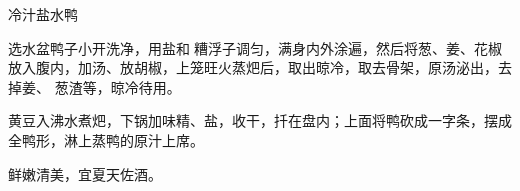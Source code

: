 \begin{recipe}{冷汁盐水鸭}

\ingredients


\preparation

\step 选水盆鸭子小开洗净，用盐和𰪿糟浮子调匀，满身内外涂遍，然后将葱、姜、花椒
放入腹内，加汤、放胡椒，上笼旺火蒸𤆵后，取出晾冷，取去骨架，原汤泌出，去掉姜、
葱渣等，晾冷待用。

\step 黄豆入沸水煮𤆵，下锅加味精、盐，收干，扦在盘内；上面将鸭砍成一字条，摆成
全鸭形，淋上蒸鸭的原汁上席。

\features

鲜嫩清美，宜夏天佐酒。

\end{recipe}

